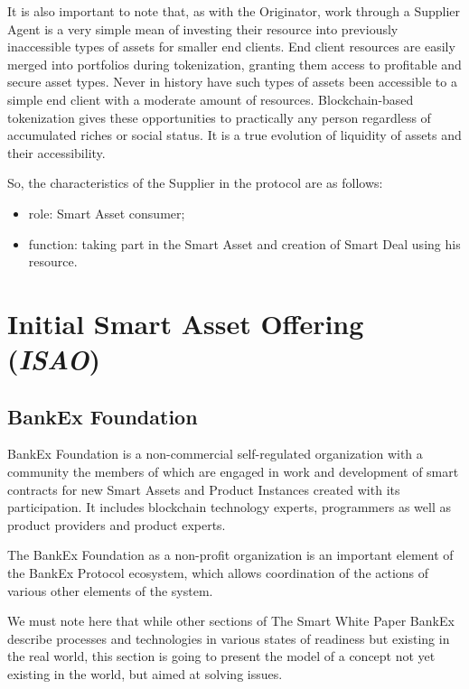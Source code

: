\documentclass{article}
\begin{document}
\begin{multicols}{2}
It is also important to note that, as with the Originator, work through a Supplier Agent is a very simple mean of investing their resource into previously inaccessible types of assets for smaller end clients. End client resources are easily merged into portfolios during tokenization, granting them access to profitable and secure asset types. Never in history have such types of assets been accessible to a simple end client with a moderate amount of resources. Blockchain-based tokenization gives these opportunities to practically any person regardless of accumulated riches or social status. It is a true evolution of liquidity of assets and their accessibility.

So, the characteristics of the Supplier in the protocol are as follows:

\begin{itemize}
\item role: Smart Asset consumer;
\item function: taking part in the Smart Asset and creation of Smart Deal using his resource.
\end{itemize}

\section{Initial Smart Asset Offering (\textit{ISAO})}

\subsection{BankEx Foundation}

BankEx Foundation is a non-commercial self-regulated organization with a community the members of which are engaged in work and development of smart contracts for new Smart Assets and Product Instances created with its participation. It includes blockchain technology experts, programmers as well as product providers and product experts.

The BankEx Foundation as a non-profit organization is an important element of the BankEx Protocol ecosystem, which allows coordination of the actions of various other elements of the system.

We must note here that while other sections of The Smart White Paper BankEx describe processes and technologies in various states of readiness but existing in the real world, this section is going to present the model of a concept not yet existing in the world, but aimed at solving issues.


\end{multicols}
\end{document}
